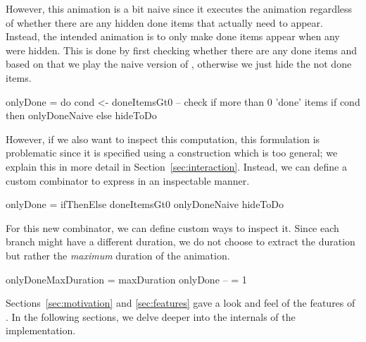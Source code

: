 However, this animation is a bit naive since it executes the 
animation regardless of whether there are any hidden done items that actually
need to appear. Instead, the intended animation is to only make done items
appear when any were hidden. This is done by first checking whether there are
any done items and based on that we play the naive version of ,
otherwise we just hide the not done items.

\begin{spec}
onlyDone = do
  cond <- doneItemsGt0    -- check if more than 0 'done' items
  if cond then onlyDoneNaive else hideToDo
\end{spec}

However, if we also want to inspect this computation, this formulation
is problematic since it is specified using a construction which is too general;
we explain this in more detail in Section~\ref{sec:interaction}. Instead, we
can define a custom combinator  to express 
in an inspectable manner.

\begin{spec}
onlyDone = ifThenElse doneItemsGt0 onlyDoneNaive hideToDo
\end{spec}

For this new combinator, we can define custom ways to inspect it. Since each
branch might have a different duration, we do not choose to extract the
duration but rather the \emph{maximum} duration of the animation.

\begin{spec}
onlyDoneMaxDuration = maxDuration onlyDone -- = 1
\end{spec}

Sections~\ref{sec:motivation} and \ref{sec:features} gave a look and feel of the
features of \dsl{}. In the following sections, we delve deeper into the
internals of the implementation.
